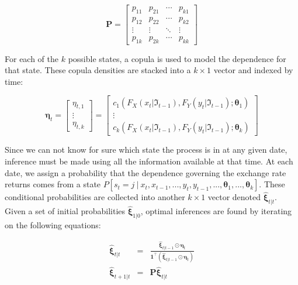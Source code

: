 \documentclass[12pt]{article}
\newcommand{\boldXi}{\hat{\boldsymbol{\xi}}}
\begin{document}
\begin{equation}
\mathbf{P}=\left[ 
\begin{array}{cccc}
p_{11} & p_{21} & \cdots & p_{k1} \\ 
p_{12} & p_{22} & \cdots & p_{k2} \\ 
\vdots & \vdots & \ddots & \vdots \\ 
p_{1k} & p_{2k} & \cdots & p_{kk}
\end{array}
\right]
\end{equation}

For each of the $k$ possible states, a copula is used to model the dependence for that state. These copula densities are stacked into a $k\times 1$ vector and indexed by time:

\begin{equation}
\boldsymbol{\eta}_{t} = \left[ 
\begin{array}{c}
\eta _{t,1} \\ 
\vdots \\ 
\eta _{t,k}
\end{array}
\right] = \left[
\begin{array}{c}
c_{1}\left(F_{X}\left(x_{t} | \Im_{t-1}\right), F_{Y}\left(y_{t} | \Im_{t-1}\right) ;\mathbf{\theta}_{1}\right) \\ 
\vdots \\ 
c_{k}\left(F_{X}\left(x_{t} | \Im_{t-1}\right), F_{Y}\left(y_{t} | \Im_{t-1}\right) ;\mathbf{\theta }_{k}\right)
\end{array}
\right]
\end{equation}

Since we can not know for sure which state the process is in at any given date, inference must be made using all the information available at that time. At each date, we assign a probability that the dependence governing the exchange rate returns comes from a state $P\left[s_{t}=j~|~x_{t},x_{t-1},...,y_{t},y_{t-1},...,\mathbf{\theta}_{1},...,\mathbf{\theta}_{k}\right]$. These conditional probabilities are collected into another $k\times 1$ vector denoted $\boldXi_{t|t}$. Given a set of initial probabilities $\boldXi_{1|0}$, optimal inferences are found by iterating on the following equations:

\begin{eqnarray}
\boldXi_{t|t} &=& \frac{\boldXi_{t|t-1}\odot\boldsymbol{\eta}_{t}}{\mathbf{1}^{\top}\left(\boldXi_{t|t-1}\odot \boldsymbol{\eta}_{t}\right)} \\
\boldXi_{t+1|t} &=& \mathbf{P} \boldXi_{t|t}
\end{eqnarray}
\end{document}
